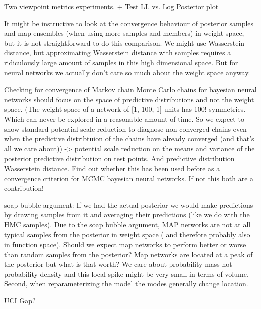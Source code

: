 \documentclass[../thesis.tex]{subfiles}
\begin{document}
Two viewpoint metrics experiments.
+ Test LL vs. Log Posterior plot

It might be instructive to look at the convergence behaviour of posterior samples and map ensembles (when using more samples and members) in weight space, but it is not straightforward to do this comparison. We might use Wasserstein distance, but approximating Wasserstein distance with samples requires a ridiculously large amount of samples in this high dimensional space. But for neural networks we actually don't care so much about the weight space anyway.

Checking for convergence of Markov chain Monte Carlo chains for bayesian neural networks should focus on the space of predictive distributions and not the weight space. (The weight space of a network of [1, 100, 1] units has 100! symmetries. Which can never be explored in a reasonable amount of time. So we expect to show standard potential scale reduction to diagnose non-converged chains even when the predictive distribtuion of the chains have already converged (and that's all we care about)) ->  potential scale reduction on the means and variance of the posterior predictive distribution on test points. And predictive distribution Wasserstein distance.
Find out whether this has been used before as a convergence criterion for MCMC bayesian neural networks. If not this both are a contribution!


soap bubble argument: If we had the actual posterior we would make predictions by drawing samples from it and averaging their predictions (like we do with the HMC samples). Due to the soap bubble argument, MAP networks are not at all typical samples from the posterior in weight space ( and therefore probably also in function space). Should we expect map networks to perform better or worse than random samples from the posterior? Map networks are located at a peak of the posterior but what is that worth? We care about probability mass not probability density and this local spike might be very small in terms of volume. Second, when reparameterizing the model the modes generally change location.


UCI Gap?
\end{document}
